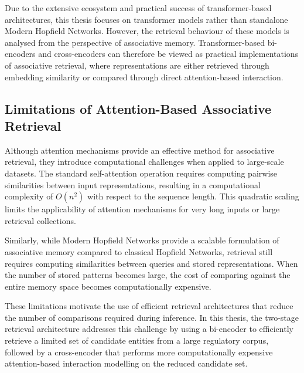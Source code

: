 Due to the extensive ecosystem and practical success of transformer-based
architectures, this thesis focuses on transformer models rather than standalone
Modern Hopfield Networks. However, the retrieval behaviour of these models is
analysed from the perspective of associative memory. Transformer-based
bi-encoders and cross-encoders can therefore be viewed as practical
implementations of associative retrieval, where representations are either
retrieved through embedding similarity or compared through direct attention-based
interaction.

\subsection{Limitations of Attention-Based Associative Retrieval}

Although attention mechanisms provide an effective method for associative
retrieval, they introduce computational challenges when applied to large-scale
datasets. The standard self-attention operation requires computing pairwise
similarities between input representations, resulting in a computational
complexity of $O(n^2)$ with respect to the sequence length. This quadratic
scaling limits the applicability of attention mechanisms for very long inputs or
large retrieval collections.

Similarly, while Modern Hopfield Networks provide a scalable formulation of
associative memory compared to classical Hopfield Networks, retrieval still
requires computing similarities between queries and stored representations.
When the number of stored patterns becomes large, the cost of comparing against
the entire memory space becomes computationally expensive.

These limitations motivate the use of efficient retrieval architectures that
reduce the number of comparisons required during inference. In this thesis, the
two-stage retrieval architecture addresses this challenge by using a
bi-encoder to efficiently retrieve a limited set of candidate entities from a
large regulatory corpus, followed by a cross-encoder that performs more
computationally expensive attention-based interaction modelling on the reduced
candidate set.